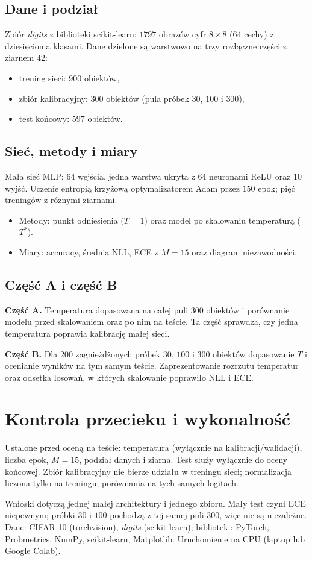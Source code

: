 \documentclass[10pt,a4paper]{article}
\begin{document}
\subsection{Dane i podział}
Zbiór \emph{digits} z biblioteki scikit-learn: $1797$ obrazów cyfr $8\times8$ (64 cechy) z dziesięcioma klasami.
Dane dzielone są warstwowo na trzy rozłączne części z ziarnem $42$:
\begin{itemize}
    \item trening sieci: $900$ obiektów,
    \item zbiór kalibracyjny: $300$ obiektów (pula próbek $30$, $100$ i $300$),
    \item test końcowy: $597$ obiektów.
\end{itemize}

\subsection{Sieć, metody i miary}
Mała sieć MLP: $64$ wejścia, jedna warstwa ukryta z $64$ neuronami ReLU oraz $10$ wyjść.
Uczenie entropią krzyżową optymalizatorem Adam przez $150$ epok; pięć treningów z różnymi ziarnami.
\begin{itemize}
    \item Metody: punkt odniesienia ($T=1$) oraz model po skalowaniu temperaturą ($T^\ast$).
    \item Miary: accuracy, średnia NLL, ECE z $M=15$ oraz diagram niezawodności.
\end{itemize}

\subsection{Część A i część B}
\textbf{Część A.} Temperatura dopasowana na całej puli $300$ obiektów i porównanie modelu przed skalowaniem oraz po nim na teście.
Ta część sprawdza, czy jedna temperatura poprawia kalibrację małej sieci.

\noindent
\textbf{Część B.} Dla $200$ zagnieżdżonych próbek $30$, $100$ i $300$ obiektów dopasowanie $T$ i ocenianie wyników na tym samym teście.
Zaprezentowanie rozrzutu temperatur oraz odsetka losowań, w których skalowanie poprawiło NLL i ECE.

\section{Kontrola przecieku i wykonalność}

\noindent
Ustalone przed oceną na teście: temperatura (wyłącznie na kalibracji/walidacji), liczba epok, $M=15$, podział danych i ziarna.
Test służy wyłącznie do oceny końcowej.
Zbiór kalibracyjny nie bierze udziału w treningu sieci; normalizacja liczona tylko na treningu; porównania na tych samych logitach.

\noindent
Wnioski dotyczą jednej małej architektury i jednego zbioru.
Mały test czyni ECE niepewnym; próbki $30$ i $100$ pochodzą z tej samej puli $300$, więc nie są niezależne.
Dane: CIFAR-10 (torchvision), \emph{digits} (scikit-learn); biblioteki: PyTorch, Probmetrics, NumPy, scikit-learn, Matplotlib.
Uruchomienie na CPU (laptop lub Google Colab).
\end{document}
